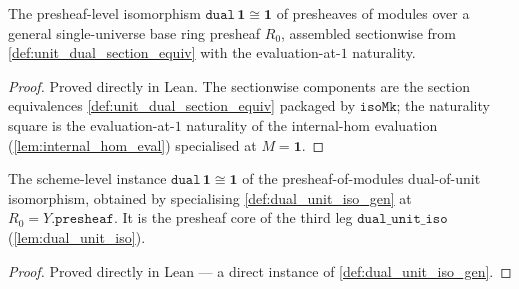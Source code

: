 \begin{definition}
  \label{def:dual_unit_iso_gen}
  The presheaf-level isomorphism
  \(\mathtt{dual}\,\mathbf 1 \cong \mathbf 1\) of presheaves of modules over a general
  single-universe base ring presheaf \(R_0\), assembled sectionwise from
  \cref{def:unit_dual_section_equiv} with the evaluation-at-\(1\) naturality.
\end{definition}
\begin{proof}
  \leanok
  Proved directly in Lean. The sectionwise components are the section equivalences
  \cref{def:unit_dual_section_equiv} packaged by \(\mathtt{isoMk}\); the naturality square is
  the evaluation-at-\(1\) naturality of the internal-hom evaluation
  (\cref{lem:internal_hom_eval}) specialised at \(M = \mathbf 1\).
\end{proof}

\begin{definition}
  \label{def:presheaf_dual_unit_iso}
  The scheme-level instance \(\mathtt{dual}\,\mathbf 1 \cong \mathbf 1\) of the
  presheaf-of-modules dual-of-unit isomorphism, obtained by specialising
  \cref{def:dual_unit_iso_gen} at \(R_0 = Y.\mathtt{presheaf}\). It is the presheaf core of
  the third leg \(\mathtt{dual\_unit\_iso}\) (\cref{lem:dual_unit_iso}).
\end{definition}
\begin{proof}
  \leanok
  Proved directly in Lean --- a direct instance of \cref{def:dual_unit_iso_gen}.
\end{proof}

